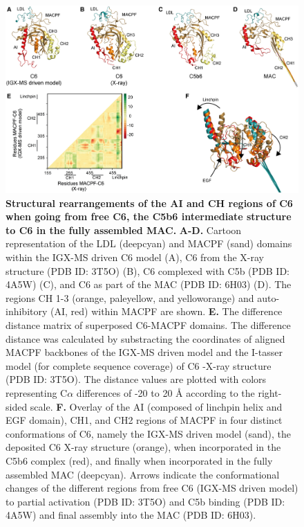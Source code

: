 \begin{subappendices}
    \begin{figure}[hbt!]
        \center
        \includegraphics[width=\textwidth]{Chapter.2/Figures/SI_EV_2.jpg} 
        \caption{\textbf{Structural rearrangements of the AI and CH regions of C6 when going from free C6, the C5b6 intermediate structure to C6 in the fully assembled MAC.} \textbf{A-D.} Cartoon representation of the LDL (deepcyan) and MACPF (sand) domains within the IGX-MS driven C6 model (A), C6 from the X-ray structure (PDB ID: 3T5O) (B), C6 complexed with C5b (PDB ID: 4A5W) (C), and C6 as part of the MAC (PDB ID: 6H03) (D). The regions CH 1-3 (orange, paleyellow, and yelloworange) and auto-inhibitory (AI, red) within MACPF are shown. \textbf{E.} The difference distance matrix of superposed C6-MACPF domains. The difference distance was calculated by substracting the coordinates of aligned MACPF backbones of the IGX-MS driven model and the I-tasser model (for complete sequence coverage) of C6 -X-ray structure (PDB ID: 3T5O). The distance values are plotted with colors representing C$\alpha$ differences of -20 to 20 Å according to the right-sided scale. \textbf{F.} Overlay of the AI (composed of linchpin helix and EGF domain), CH1, and CH2 regions of MACPF in four distinct conformations of C6, namely the IGX-MS driven model (sand), the deposited C6 X-ray structure (orange), when incorporated in the C5b6 complex (red), and finally when incorporated in the fully assembled MAC (deepcyan). Arrows indicate the conformational changes of the different regions from free C6 (IGX-MS driven model) to partial activation (PDB ID: 3T5O) and C5b binding (PDB ID: 4A5W) and final assembly into the MAC (PDB ID: 6H03).}
        \label{fig:ch2_app_fig7}
    \end{figure}


\end{subappendices}
